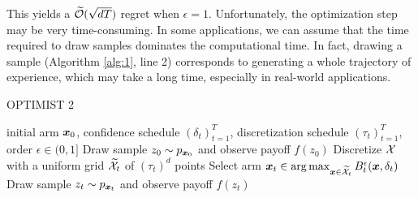 \documentclass{article}
\makeatletter
\DeclareRobustCommand{\algoname}{OPTIMIST\@\xspace}
\makeatother
\begin{document}
%
This yields a $\widetilde{\mathcal{O}}(\sqrt{dT})$ regret when $\epsilon=1$. Unfortunately, the optimization step may be very time-consuming. In some applications, we can assume that the time required to draw samples dominates the computational time. In fact, drawing a sample (Algorithm \ref{alg:1}, line 2) corresponds to generating a whole trajectory of experience, which may take a long time, especially in real-world applications.

\begin{algorithm}[t]
	\caption{\algoname2}
	\label{alg:2}
	\begin{algorithmic}[1]
		 initial arm $\boldsymbol{x}_0$, confidence schedule $(\delta_t)_{t=1}^T$, discretization schedule $(\tau_t)_{t=1}^T$, order $\epsilon\in(0,1]$
		\STATE Draw sample $z_0\sim p_{\boldsymbol{x}_0}$ and observe payoff $f(z_0)$
		\STATE Discretize $\mathcal{X}$ with a uniform grid $\widetilde{\mathcal{X}}_t$ of $(\tau_t)^d$ points
		\STATE Select arm $\boldsymbol{x}_t \in \arg\max_{\boldsymbol{x}\in\widetilde{\mathcal{X}}_t}B_t^{\epsilon}(\boldsymbol{x},\delta_t)$
		\STATE Draw sample $z_t\sim p_{\boldsymbol{x}_t}$ and observe payoff $f(z_t)$
		\ENDFOR
	\end{algorithmic}
\end{algorithm}
%
\end{document}
